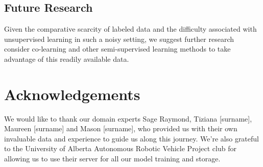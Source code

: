 \documentclass{article}
\begin{document}
\subsection{Future Research}
Given the comparative scarcity of labeled data and the difficulty associated with unsupervised learning in such a noisy setting, we suggest further research consider co-learning and other semi-supervised learning methods to take advantage of this readily available data.

\section{Acknowledgements}
We would like to thank our domain experts Sage Raymond, Tiziana [surname], Maureen [surname] and Mason [surname], who provided us with their own invaluable data and experience to guide us along this journey. We’re also grateful to the University of Alberta Autonomous Robotic Vehicle Project club for allowing us to use their server for all our model training and storage.
\clearpage


\end{document}
